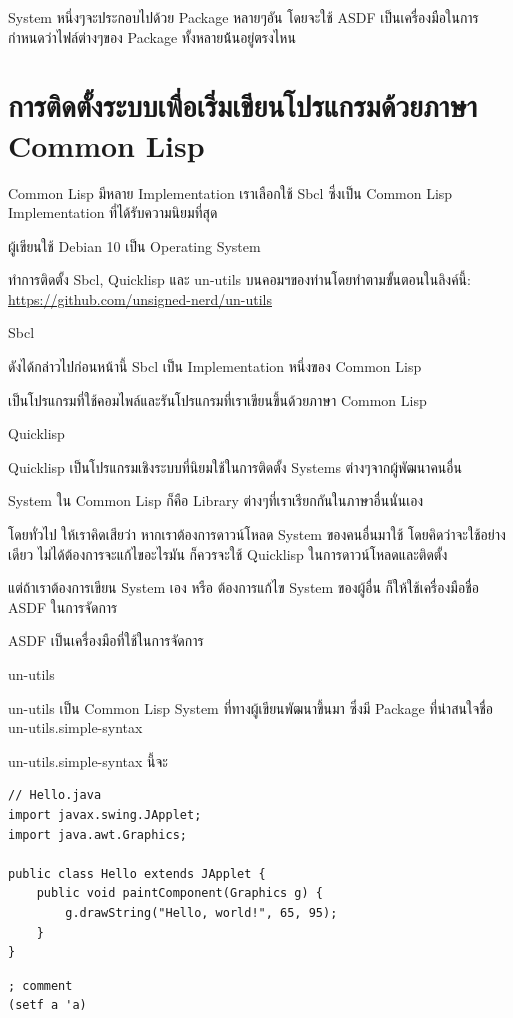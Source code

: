 \documentclass[a4paper]{article}
\begin{document}
System หนึ่งๆจะประกอบไปด้วย Package หลายๆอัน โดยจะใช้ ASDF เป็นเครื่องมือในการ%
กำหนดว่าไฟล์ต่างๆของ Package ทั้งหลายน้้นอยู่ตรงไหน


\section{การติดตั้งระบบเพื่อเริ่มเขียนโปรแกรมด้วยภาษา Common Lisp}

Common Lisp มีหลาย Implementation เราเลือกใช้ Sbcl ซึ่งเป็น Common Lisp Implementation ที่ได้รับความนิยมที่สุด

ผู้เขียนใช้ Debian 10 เป็น Operating System

ทำการติดตั้ง Sbcl, Quicklisp และ un-utils บนคอมฯของท่านโดยทำตามขั้นตอนในลิงค์นี้:
\href{https://github.com/unsigned-nerd/un-utils}{https://github.com/unsigned-nerd/un-utils}

Sbcl

ดังได้กล่าวไปก่อนหน้านี้ Sbcl เป็น Implementation หนึ่งของ Common Lisp

เป็นโปรแกรมที่ใช้คอมไพล์และรันโปรแกรมที่เราเขียนขึ้นด้วยภาษา Common Lisp

Quicklisp

Quicklisp เป็นโปรแกรมเชิงระบบที่นิยมใช้ในการติดตั้ง Systems ต่างๆจากผู้พัฒนาคนอื่น

System ใน Common Lisp ก็คือ Library ต่างๆที่เราเรียกกันในภาษาอื่นนั่นเอง

โดยทั่วไป ให้เราคิดเสียว่า หากเราต้องการดาวน์โหลด System ของคนอื่นมาใช้
โดยคิดว่าจะใช้อย่างเดียว ไม่ได้ต้องการจะแก้ไขอะไรมัน ก็ควรจะใช้ Quicklisp
ในการดาวน์โหลดและติดตั้ง

แต่ถ้าเราต้องการเขียน System เอง หรือ ต้องการแก้ไข System ของผู้อื่น ก็ให้ใช้เครื่องมือชื่อ
ASDF ในการจัดการ

ASDF เป็นเครื่องมือที่ใช้ในการจัดการ

un-utils

un-utils เป็น Common Lisp System ที่ทางผู้เขียนพัฒนาขึ้นมา ซึ่งมี Package ที่น่าสนใจชื่อ
un-utils.simple-syntax

un-utils.simple-syntax นี้จะ

\lstset{language=Java}
\begin{lstlisting}
// Hello.java
import javax.swing.JApplet;
import java.awt.Graphics;

public class Hello extends JApplet {
    public void paintComponent(Graphics g) {
        g.drawString("Hello, world!", 65, 95);
    }    
}
\end{lstlisting}

\lstset{language=Lisp}
\begin{lstlisting}
; comment
(setf a 'a)
\end{lstlisting}
\end{document}
